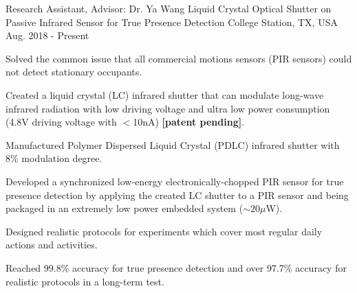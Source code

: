

\begin{cventries}

  \cventry
    {Research Assistant, Advisor: Dr. Ya Wang} %
    {Liquid Crystal Optical Shutter on Passive Infrared Sensor for True Presence Detection} %
    {College Station, TX, USA} %
    {Aug. 2018 - Present} %
    {
      \begin{cvitems} %
        \item Solved the common issue that all commercial motions sensors (PIR sensors) could not detect stationary occupants.
        \item Created a liquid crystal (LC) infrared shutter that can modulate long-wave infrared radiation with low driving voltage and ultra low power consumption (4.8V driving voltage with $<$10nA) \textbf{[patent pending]}.
        \item Manufactured Polymer Dispersed Liquid Crystal (PDLC) infrared shutter with 8\% modulation degree.
        \item Developed a synchronized low-energy electronically-chopped PIR sensor for true presence detection by applying the created LC shutter to a PIR sensor and being packaged in an extremely low power embedded system ($\sim20\mu$W).
        \item Designed realistic protocols for experiments which cover most regular daily actions and activities. 
        \item Reached 99.8\% accuracy for true presence detection and over 97.7\% accuracy for realistic protocols in a long-term test. 
      \end{cvitems}
    }


\end{cventries}
